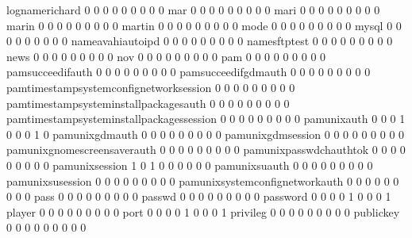 \documentclass[compress,8pt]{beamer}
\begin{document}
\begin{frame}
\begin{Schunk}
  lognamerichard                             0   0   0   0   0   0   0   0   0
  mar                                        0   0   0   0   0   0   0   0   0
  mari                                       0   0   0   0   0   0   0   0   0
  marin                                      0   0   0   0   0   0   0   0   0
  martin                                     0   0   0   0   0   0   0   0   0
  mode                                       0   0   0   0   0   0   0   0   0
  mysql                                      0   0   0   0   0   0   0   0   0
  nameavahiautoipd                           0   0   0   0   0   0   0   0   0
  namesftptest                               0   0   0   0   0   0   0   0   0
  news                                       0   0   0   0   0   0   0   0   0
  nov                                        0   0   0   0   0   0   0   0   0
  pam                                        0   0   0   0   0   0   0   0   0
  pamsucceedifauth                           0   0   0   0   0   0   0   0   0
  pamsucceedifgdmauth                        0   0   0   0   0   0   0   0   0
  pamtimestampsystemconfignetworksession     0   0   0   0   0   0   0   0   0
  pamtimestampsysteminstallpackagesauth      0   0   0   0   0   0   0   0   0
  pamtimestampsysteminstallpackagessession   0   0   0   0   0   0   0   0   0
  pamunixauth                                0   0   0   1   0   0   0   1   0
  pamunixgdmauth                             0   0   0   0   0   0   0   0   0
  pamunixgdmsession                          0   0   0   0   0   0   0   0   0
  pamunixgnomescreensaverauth                0   0   0   0   0   0   0   0   0
  pamunixpasswdchauthtok                     0   0   0   0   0   0   0   0   0
  pamunixsession                             1   0   1   0   0   0   0   0   0
  pamunixsuauth                              0   0   0   0   0   0   0   0   0
  pamunixsusession                           0   0   0   0   0   0   0   0   0
  pamunixsystemconfignetworkauth             0   0   0   0   0   0   0   0   0
  pass                                       0   0   0   0   0   0   0   0   0
  passwd                                     0   0   0   0   0   0   0   0   0
  password                                   0   0   0   0   1   0   0   0   1
  player                                     0   0   0   0   0   0   0   0   0
  port                                       0   0   0   0   1   0   0   0   1
  privileg                                   0   0   0   0   0   0   0   0   0
  publickey                                  0   0   0   0   0   0   0   0   0

\end{Schunk}
\end{frame}
\end{document}
